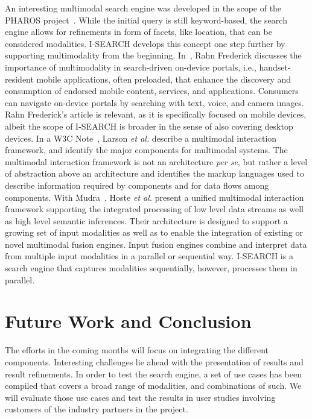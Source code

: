 \documentclass{acm_proc_article-sp}
\begin{document}
An interesting multimodal search engine was developed in the scope of the PHAROS project~\cite{pharos2009}.
While the initial query is still keyword-based, the search engine allows for refinements in form of facets, like location, that can be considered modalities.
\mbox{I-SEARCH} develops this concept one step further by supporting multimodality from the beginning.
In~\cite{multimodalitysun}, Rahn Frederick discusses the importance of multimodality in search-driven on-device portals, i.e., handset-resident mobile applications, often preloaded, that enhance the discovery and consumption of endorsed mobile content, services, and applications.
Consumers can navigate on-device portals by searching with text, voice, and camera images.
Rahn Frederick's article is relevant, as it is specifically focused on mobile devices, albeit the scope of \mbox{I-SEARCH} is broader in the sense of also covering desktop devices. 
In a W3C Note~\cite{w3cmultimodal2003}, Larson \textit{et al.} describe a multimodal interaction framework, and identify the major components for multimodal systems.
The multimodal interaction framework is not an architecture \textit{per se}, but rather a level of abstraction above an architecture and identifies the markup languages used to describe information required by components and for data flows among components.
With Mudra~\cite{mudra2011}, Hoste \textit{et al.} present a unified multimodal interaction framework supporting the integrated processing of low level data streams as well as high level semantic inferences.
Their architecture is designed to support a growing set of input modalities as well as to enable the integration of existing or novel multimodal fusion engines.
Input fusion engines combine and interpret data from multiple input modalities in a parallel or sequential way.
\mbox{I-SEARCH} is a search engine that captures modalities sequentially, however, processes them in parallel.

\section{Future Work and Conclusion} \label{sec:futureworkconclusion}
The efforts in the coming months will focus on integrating the different components.
Interesting challenges lie ahead with the presentation of results and result refinements.
In order to test the search engine, a set of use cases has been compiled that covers a broad range of modalities, and combinations of such.
We will evaluate those use cases and test the results in user studies involving customers of the industry partners in the project.
\end{document}
